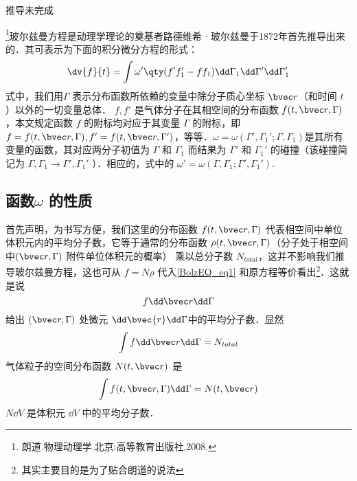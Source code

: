 
\begin{issues}

\issueDraft
推导未完成
\end{issues}

\footnote{朗道.物理动理学.北京:高等教育出版社,2008.}玻尔兹曼方程是动理学理论的奠基者路德维希 $\cdot$ 玻尔兹曼于1872年首先推导出来的．其可表示为下面的积分微分方程的形式：
\begin{equation}\label{BolzEQ_eq1}
\dv{f}{t}=\int\omega'\qty(f'f_1'-ff_1)\dd\Gamma_1\dd\Gamma'\dd\Gamma_1'
\end{equation}
式中，我们用$\Gamma$ 表示分布函数所依赖的变量中除分子质心坐标 $\bvec r$（和时间 $t$ ）以外的一切变量总体． $f,f'$ 是气体分子在其相空间的分布函数 $f(t,\bvec r,\Gamma)$，本文规定函数 $f$ 的附标均对应于其变量 $\Gamma$ 的附标，即$f=f(t,\bvec r,\Gamma),f'=f(t,\bvec r,\Gamma')$，等等．$\omega=\omega(\Gamma',\Gamma_1';\Gamma,\Gamma_1)$是其所有变量的函数，其对应两分子初值为 $\Gamma$ 和 $\Gamma_1$ 而结果为 $\Gamma'$ 和 $\Gamma_1'$ 的碰撞（该碰撞简记为 $\Gamma,\Gamma_1\rightarrow\Gamma',\Gamma_1'$ ）．相应的，式中的 $\omega'=\omega(\Gamma,\Gamma_1;\Gamma',\Gamma_1')$.

\subsection{函数$\omega$ 的性质}
首先声明，为书写方便，我们这里的分布函数 $f(t,\bvec r,\Gamma)$ 代表相空间中单位体积元内的平均分子数，它等于通常的分布函数 $\rho(t,\bvec r,\Gamma)$（分子处于相空间中$(\bvec r,\Gamma)$ 附件单位体积元的概率） 乘以总分子数 $N_{total}$，这并不影响我们推导玻尔兹曼方程，这也可从 $f=N\rho$ 代入\autoref{BolzEQ_eq1} 和原方程等价看出\footnote{其实主要目的是为了贴合朗道的说法}．这就是说
\begin{equation}
f\dd \bvec r\dd\Gamma
\end{equation}
给出 $(\bvec r,\Gamma)$ 处微元 $\dd\bvec{r}\dd\Gamma$中的平均分子数．显然
\begin{equation}
\int f\dd \bvec r\dd\Gamma=N_{total}
\end{equation}
气体粒子的空间分布函数 $N(t,\bvec r)$ 是
\begin{equation}
\int f(t,\bvec r,\Gamma)\dd \Gamma=N(t,\bvec r)
\end{equation}
 $N\dd V$ 是体积元 $\dd V$ 中的平均分子数．

